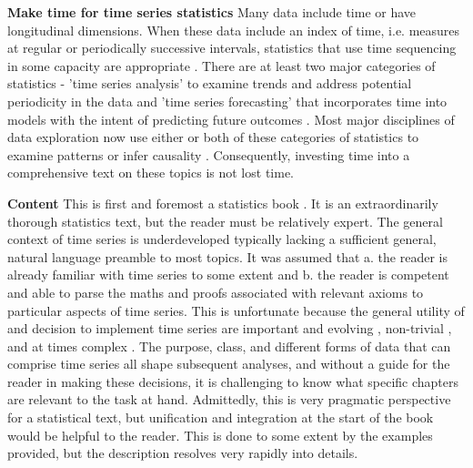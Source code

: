 \documentclass[bookreview]{jss}
\begin{document}
\textbf{Make time for time series statistics} \newline
Many data include time or have longitudinal dimensions. When these data include an index of time, i.e. measures at regular or periodically successive intervals, statistics that use time sequencing in some capacity are appropriate \citep{Senin2009}. There are at least two major categories of statistics - 'time series analysis' to examine trends and address potential periodicity in the data and 'time series forecasting' that incorporates time into models with the intent of predicting future outcomes \citep{Senin2009}. Most major disciplines of data exploration now use either or both of these categories of statistics to examine patterns or infer causality \citep{Gooijer2006}. Consequently, investing time into a comprehensive text on these topics is not lost time.  \newline


\textbf{Content} \newline
This is first and foremost a statistics book \citep{Woodward2017}. It is an extraordinarily thorough statistics text, but the reader must be relatively expert. The general context of time series is underdeveloped typically lacking a sufficient general, natural language preamble to most topics. It was assumed that a. the reader is already familiar with time series to some extent and b. the reader is competent and able to parse the maths and proofs associated with relevant axioms to particular aspects of time series. This is unfortunate because the general utility of and decision to implement time series are important and evolving \citep{Mishra2017}, non-trivial \citep{Webby1996}, and at times complex \citep{Fu2011, Tang2015}. The purpose, class, and different forms of data that can comprise time series all shape subsequent analyses, and without a guide for the reader in making these decisions, it is challenging to know what specific chapters are relevant to the task at hand. Admittedly, this is very pragmatic perspective for a statistical text, but unification and integration at the start of the book would be helpful to the reader. This is done to some extent by the examples provided, but the description resolves very rapidly into details. \newline
\end{document}
